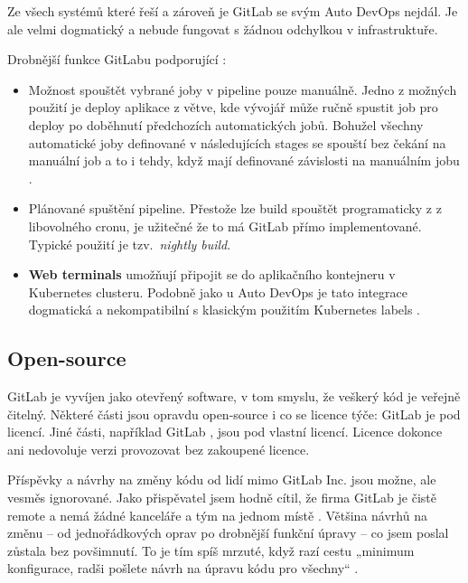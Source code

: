         Ze všech systémů které řeší \CI a zároveň \CD je GitLab se svým Auto DevOps nejdál. Je ale velmi dogmatický a nebude fungovat s žádnou odchylkou v infrastruktuře.

        Drobnější funkce GitLabu podporující \CD:
        \begin{itemize}
            \item Možnost spouštět vybrané joby v pipeline pouze manuálně. Jedno z možných použití je deploy aplikace z  větve, kde vývojář může ručně spustit job pro deploy po doběhnutí předchozích automatických jobů. Bohužel všechny automatické joby definované v následujících stages se spouští bez čekání na manuální job a to i tehdy, když mají definované závislosti na manuálním jobu \cite{gitlab-issue-manual-job}.
            \item Plánované spuštění pipeline. Přestože lze build spouštět programaticky z  z libovolného cronu, je užitečné že to má GitLab přímo implementované. Typické použití je tzv.~\textit{nightly build}.
            \item \textbf{Web terminals} umožňují připojit se do aplikačního kontejneru v Kubernetes clusteru. Podobně jako u Auto DevOps je tato integrace dogmatická a nekompatibilní s klasickým použitím Kubernetes labels \cite{gitlab-issue-k8s-deploy}.
        \end{itemize}

    \subsection{Open-source}
        GitLab je vyvíjen jako otevřený software, v tom smyslu, že veškerý kód je veřejně čitelný. Některé části jsou opravdu open-source i co se licence týče: GitLab  je pod  licencí. Jiné části, například GitLab , jsou pod vlastní licencí. Licence dokonce ani nedovoluje  verzi provozovat bez zakoupené licence.

        Příspěvky a návrhy na změny kódu od lidí mimo GitLab Inc. jsou možne, ale vesměs ignorované. Jako přispěvatel jsem hodně cítil, že firma GitLab je čistě remote a nemá žádné kanceláře a tým na jednom místě \cite{gitlab-team}. Většina návrhů na změnu -- od jednořádkových oprav po drobnější funkční úpravy -- co jsem poslal zůstala bez povšimnutí. To je tím spíš mrzuté, když razí cestu „minimum konfigurace, radši pošlete návrh na úpravu kódu pro všechny“ \cite{gitlab-no-custom}.

